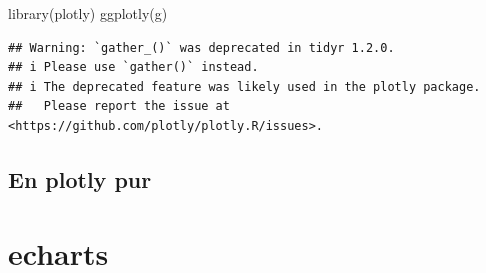 \documentclass[
]{book}
\newenvironment{Shaded}{\begin{snugshade}}{\end{snugshade}}
\newcommand{\AttributeTok}[1]{\textcolor[rgb]{0.77,0.63,0.00}{#1}}
\newcommand{\FunctionTok}[1]{\textcolor[rgb]{0.00,0.00,0.00}{#1}}
\newcommand{\NormalTok}[1]{#1}
\newcommand{\SpecialCharTok}[1]{\textcolor[rgb]{0.00,0.00,0.00}{#1}}
\newcommand{\StringTok}[1]{\textcolor[rgb]{0.31,0.60,0.02}{#1}}
\begin{document}
\begin{Shaded}
\begin{Highlighting}[]
\FunctionTok{library}\NormalTok{(plotly)}
\FunctionTok{ggplotly}\NormalTok{(g)}
\end{Highlighting}
\end{Shaded}

\begin{verbatim}
## Warning: `gather_()` was deprecated in tidyr 1.2.0.
## i Please use `gather()` instead.
## i The deprecated feature was likely used in the plotly package.
##   Please report the issue at <https://github.com/plotly/plotly.R/issues>.
\end{verbatim}

\hypertarget{en-plotly-pur}{%
\subsection{En plotly pur}\label{en-plotly-pur}}

\begin{Shaded}
\end{Shaded}

\hypertarget{echarts}{%
\section{echarts}\label{echarts}}
\end{document}
